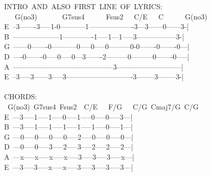 {INTRO\ AND\ ALSO\ FIRST\ LINE\ OF\ LYRICS:\\
\ \ \ G(no3)\ \ \ \ \ \ \ G7sus4\ \ \ \ \ \ Fsus2\ \ \ C/E\ \ \ C\ \ \ \ \ \ G(no3)\\
E\ --3-------3-----1-0-----------1-------------------3---3------0------3-|\\
B\ --------------------1-------------1-----1---1-----3-----------------3-|\\
G\ ------0-------0-----------0-----0-----0---------0-0-------0-------0---|\\
D\ ----0-------0-----0-----0---3-------2---------0---------0-------0-----|\\
A\ ------------------------------------------3---------------------------|\\
E\ --3-----3------3-----3----------------------------3--------3--------3-|\\
\\
CHORDS:\\
\ G(no3)\ G7sus4\ Fsus2\ \ C/E\ \ \ F/G\ \ \ C/G\ Cmaj7/G\ C/G\\
E\ ---3-----1-----1-----0-----1-----0-----0-----3---|\\
B\ ---3-----1-----1-----1-----1-----1-----0-----1---|\\
G\ ---0-----0-----0-----0-----2-----0-----0-----0---|\\
D\ ---0-----0-----3-----2-----3-----2-----2-----2---|\\
A\ ---x-----x-----x-----x-----3-----3-----3-----x---|\\
E\ ---3-----3-----x-----x-----3-----3-----3-----3---|\\}
